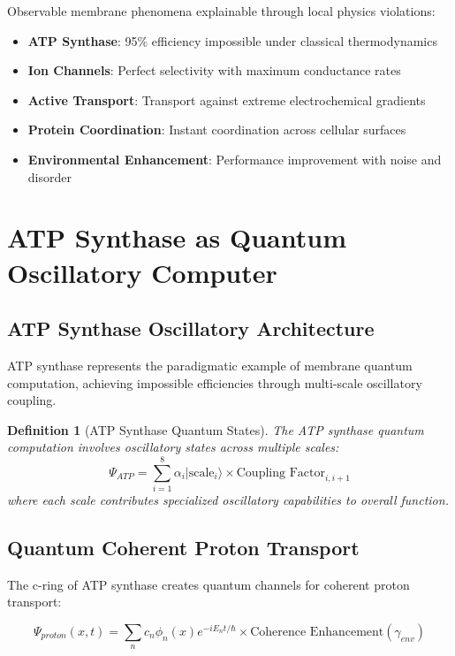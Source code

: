 \documentclass[12pt,a4paper]{article}
\newtheorem{definition}{Definition}
\begin{document}
Observable membrane phenomena explainable through local physics violations:

\begin{itemize}
\item \textbf{ATP Synthase}: 95\% efficiency impossible under classical thermodynamics
\item \textbf{Ion Channels}: Perfect selectivity with maximum conductance rates
\item \textbf{Active Transport}: Transport against extreme electrochemical gradients
\item \textbf{Protein Coordination}: Instant coordination across cellular surfaces
\item \textbf{Environmental Enhancement}: Performance improvement with noise and disorder
\end{itemize}

\section{ATP Synthase as Quantum Oscillatory Computer}

\subsection{ATP Synthase Oscillatory Architecture}

ATP synthase represents the paradigmatic example of membrane quantum computation, achieving impossible efficiencies through multi-scale oscillatory coupling.

\begin{definition}[ATP Synthase Quantum States]
The ATP synthase quantum computation involves oscillatory states across multiple scales:
\begin{equation}
\Psi_{ATP} = \sum_{i=1}^{8} \alpha_i |\text{scale}_i\rangle \times \text{Coupling Factor}_{i,i+1}
\end{equation}
where each scale contributes specialized oscillatory capabilities to overall function.
\end{definition}

\subsection{Quantum Coherent Proton Transport}

The c-ring of ATP synthase creates quantum channels for coherent proton transport:

\begin{equation}
\Psi_{proton}(x,t) = \sum_{n} c_n \phi_n(x) e^{-iE_n t/\hbar} \times \text{Coherence Enhancement}(\gamma_{env})
\end{equation}
\end{document}
